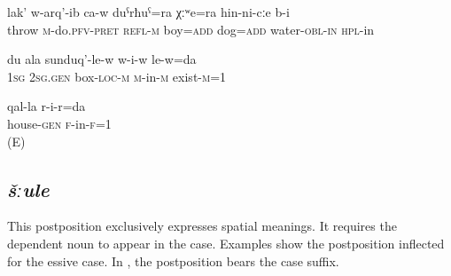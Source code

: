 \begin{exe}
	\ex
	\begin{xlist}
		\ex	\label{(It) threw the boy and the dog into the water}
		\gll	lak'	w-arq'-ib	ca-w	duˁrħuˁ=ra	χːʷe=ra	hin-ni-cːe b-i  \\
			throw	\textsc{m}-do.\textsc{pfv}-\textsc{pret}	\textsc{refl}-\textsc{m}	boy=\textsc{add}	dog=\textsc{add} water-\textsc{obl}-\textsc{in} \textsc{hpl}-in\\
		\glt	{}

		\ex	\label{Iam inside your box}
		\gll	du	ala	sunduq'-le-w	w-i-w	le-w=da  \\
			1\textsc{sg}	2\textsc{sg}.\textsc{gen}	box-\textsc{loc}-\textsc{m}	\textsc{m}-in-\textsc{m}	exist-\textsc{m}=1\\
		\glt	{}

		\ex	\label{Iaminside the house}
		\gll	qal-la r-i-r=da  \\
			house-\textsc{gen} \textsc{f}-in-\textsc{f}=1\\
		\glt	{} (E)
	\end{xlist}
\end{exe}



\subsection{\textit{šːule} }
\label{ssec:postposition sule}

This postposition exclusively expresses spatial meanings. It requires the dependent noun to appear in the  case. Examples  show the postposition inflected for the essive case. In , the postposition bears the  case suffix.

